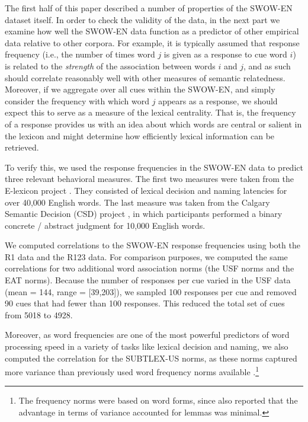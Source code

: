\documentclass[a4paper,doc,natbib,floatsintext]{apa6}
\begin{document}
The first half of this paper described a number of properties of the SWOW-EN dataset itself. In order to check the validity of the data, in the next part we examine how well the SWOW-EN data function as a predictor of other empirical data relative to other corpora. For example, it is typically assumed that response frequency (i.e., the number of times word $j$ is given as a response to cue word $i$) is related to the {\it strength} of the association between words $i$ and $j$, and as such should correlate reasonably well with other measures of semantic relatedness. Moreover, if we aggregate over all cues within the SWOW-EN, and simply consider the frequency with which word $j$ appears as a response, we should expect this to serve as a measure of the lexical centrality. That is, the frequency of a response provides us with an idea about which words are central or salient in the lexicon and might determine how efficiently lexical information can be retrieved.

To verify this, we used the response frequencies in the SWOW-EN data to predict three relevant behavioral measures. The first two measures were taken from the E-lexicon project \cite[http://elexicon.wustl.edu/]{BalotaYap2007}. They consisted of lexical decision and naming latencies for over 40,000 English words. The last measure was taken from the Calgary Semantic Decision (CSD) project \citep{PexmanHeard2017}, in which participants performed a binary concrete / abstract judgment for 10,000 English words.

We computed correlations to the SWOW-EN response frequencies using both the R1 data and the R123 data. For comparison purposes, we computed the same correlations for two additional word association norms (the USF norms and the EAT norms).
Because the number of responses per cue varied in the USF data (mean = 144, range = [39,203]), we sampled 100 responses per cue and removed 90 cues that had fewer than 100 responses. This reduced the total set of cues from 5018 to 4928.

Moreover, as word frequencies are one of the most powerful predictors of word processing speed \citep{BrysbaertNew2009} in a variety of tasks like lexical decision and naming, we also computed the correlation for the SUBTLEX-US norms, as these norms captured more variance than previously used word frequency norms available \citep{BrysbaertNew2009}.\footnote{The frequency norms were based on word forms, since \citet{BrysbaertNew2009} also reported that the advantage in terms of variance accounted for lemmas was minimal.}
\end{document}

